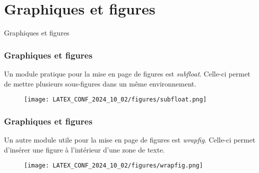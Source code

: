 
\section{Graphiques et figures}

\begin{frame}
    \vfill
    \begin{center}
        \large
        Graphiques et figures
    \end{center}
    \vfill
\end{frame}

\begin{frame}
    \frametitle{Graphiques et figures}
    Un module pratique pour la mise en page de figures est \textcolor{hard_green}{\textit{subfloat}}\footnotemark. Celle-ci permet de mettre plusieurs sous-figures dans un même environnement.
    \vfill
    \begin{figure}
        \centering
        \texttt{[image: LATEX\_CONF\_2024\_10\_02/figures/subfloat.png]}
        \label{fig: subfloat}
    \end{figure}
\end{frame}

\begin{frame}
    \frametitle{Graphiques et figures}
    Un autre module utile pour la mise en page de figures est \textcolor{hard_green}{\textit{wrapfig}}\footnotemark. Celle-ci permet d'insérer une figure à l'intérieur d'une zone de texte.
    \vfill
    \begin{figure}
        \centering
        \texttt{[image: LATEX\_CONF\_2024\_10\_02/figures/wrapfig.png]}
        \label{fig: wrapfig}
    \end{figure}
\end{frame}


